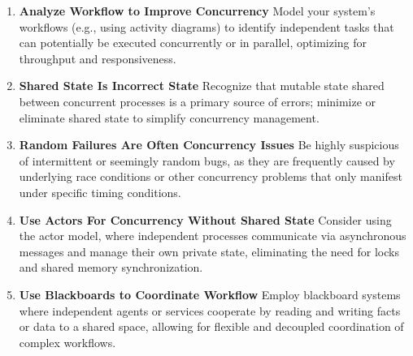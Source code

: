 \documentclass[11pt]{article}
\begin{document}
\begin{tcolorbox}[pragchapterbox={Chapter 6: Concurrency}]
\begin{multicols}{2}
\begin{enumerate}[label=\arabic*., start=56, itemsep=1ex, topsep=0pt, partopsep=0pt, labelwidth=!, labelindent=0pt, leftmargin=*]
    \item \textbf{Analyze Workflow to Improve Concurrency}
    Model your system's workflows (e.g., using activity diagrams) to identify independent tasks that can potentially be executed concurrently or in parallel, optimizing for throughput and responsiveness.

    \item \textbf{Shared State Is Incorrect State}
    Recognize that mutable state shared between concurrent processes is a primary source of errors; minimize or eliminate shared state to simplify concurrency management.

    \item \textbf{Random Failures Are Often Concurrency Issues}
    Be highly suspicious of intermittent or seemingly random bugs, as they are frequently caused by underlying race conditions or other concurrency problems that only manifest under specific timing conditions.

    \item \textbf{Use Actors For Concurrency Without Shared State}
    Consider using the actor model, where independent processes communicate via asynchronous messages and manage their own private state, eliminating the need for locks and shared memory synchronization.

    \item \textbf{Use Blackboards to Coordinate Workflow}
    Employ blackboard systems where independent agents or services cooperate by reading and writing facts or data to a shared space, allowing for flexible and decoupled coordination of complex workflows.
\end{enumerate}
\end{multicols}
\end{tcolorbox}
\end{document}
